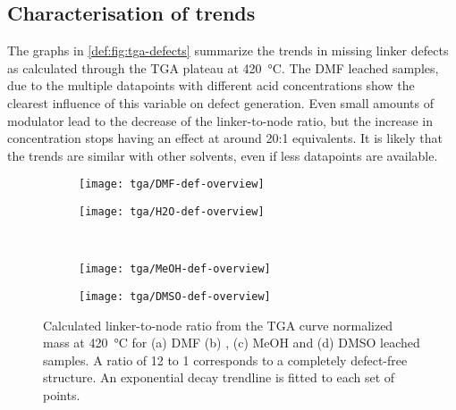 
\subsection{Characterisation of trends}\label{def:trends}

The graphs in \autoref{def:fig:tga-defects} summarize the 
trends in missing linker defects as calculated through 
the \gls{TGA} plateau at \SI{420}{\degreeCelsius}. The \gls{DMF} leached samples,
due to the multiple datapoints with different acid concentrations
show the clearest influence of this variable on defect
generation. Even small amounts of modulator lead to the decrease of 
the linker-to-node ratio, but the increase in concentration stops 
having an effect at around 20:1 equivalents. It is likely that
the trends are similar with other solvents, even if less 
datapoints are available.

\begin{figure}[htb]
    \centering

    \begin{subfigure}{0.33\linewidth}
		\parbox[c]{0.12\linewidth}{\caption{}%
			\label{def:fig:tga-dmf-linkers}}%
		\parbox[b]{0.88\linewidth}{%
			\texttt{[image: tga/DMF-def-overview]}%
		}%
    \end{subfigure}%
    \begin{subfigure}{0.33\linewidth}
		\parbox[c]{0.12\linewidth}{\caption{}%
			\label{def:fig:tga-h2o-linkers}}%
		\parbox[b]{0.88\linewidth}{%
			\texttt{[image: tga/H2O-def-overview]}%
		}%
    \end{subfigure}%
    \\
    \begin{subfigure}{0.33\linewidth}
		\parbox[c]{0.12\linewidth}{\caption{}%
			\label{def:fig:tga-meoh-linkers}}%
		\parbox[b]{0.88\linewidth}{%
			\texttt{[image: tga/MeOH-def-overview]}%
		}%
    \end{subfigure}%
    \begin{subfigure}{0.33\linewidth}
		\parbox[c]{0.12\linewidth}{\caption{}%
			\label{def:fig:tga-dmso-linkers}}%
		\parbox[b]{0.88\linewidth}{%
			\texttt{[image: tga/DMSO-def-overview]}%
		}%
    \end{subfigure}%

    \caption{Calculated linker-to-node ratio from the \gls{TGA} curve 
    normalized mass at \SI{420}{\degreeCelsius} for (a) \gls{DMF} 
    (b) , (c) \gls{MeOH} and (d) \gls{DMSO} leached samples.
    A ratio of 12 to 1 corresponds to a completely defect-free
    structure. An exponential decay trendline is fitted to 
    each set of points.}%
    \label{def:fig:tga-defects}
    
\end{figure}

